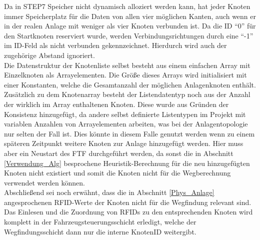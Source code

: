 			Da in \ac{STEP7} Speicher nicht dynamisch alloziert werden kann, hat jeder Knoten immer Speicherplatz für die Daten von allen vier möglichen Kanten, auch wenn er in der realen Anlage mit weniger als vier Knoten verbunden ist. Da die ID "`0"' für den Startknoten reserviert wurde, werden Verbindungsrichtungen durch eine "`-1"' im ID-Feld als nicht verbunden gekennzeichnet. Hierdurch wird auch der zugehörige Abstand ignoriert.
			\\[4pt]
			Die Datenstruktur der Knotenliste selbst besteht aus einem einfachen Array mit Einzelknoten als Arrayelementen. Die Größe dieses Arrays wird initialisiert mit einer Konstanten, welche die Gesamtanzahl der möglichen Anlagenknoten enthält. Zusätzlich zu dem Knotenarray besteht der Listendatentyp noch aus der Anzahl der wirklich im Array enthaltenen Knoten. Diese wurde aus Gründen der Konsistenz hinzugefügt, da andere selbst definierte Listentypen im Projekt mit variablen Anzahlen von Arrayelementen arbeiten, was bei der Anlagentopologie nur selten der Fall ist. Dies könnte in diesem Falle genutzt werden wenn zu einem späteren Zeitpunkt weitere Knoten zur Anlage hinzugefügt werden. Hier muss aber ein Neustart des \ac{FTF} durchgeführt werden, da sonst die in Abschnitt \ref{Verwendung_Alg} besprochene Heuristik-Berechnung für die neu hinzugefügten Knoten nicht existiert und somit die Knoten nicht für die Wegberechnung verwendet werden können.
			\\[4pt]
			Abschließend sei noch erwähnt, dass die in Abschnitt \ref{Phys_Anlage} angesprochenen \ac{RFID}-Werte der Knoten nicht für die Wegfindung relevant sind. Das Einlesen und die Zuordnung von \ac{RFID}s zu den entsprechenden Knoten wird komplett in der Fahrzeugsteuerungsschicht erledigt, welche der Wegfindungsschicht dann nur die interne KnotenID weitergibt.
			
